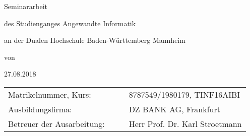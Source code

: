	\begin{titlepage}
		
		\centering
		{\Large\bfseries \Titel \par}
		\vspace{2cm}
		Seminararbeit \par
		\vspace{3cm}
		
		des Studienganges Angewandte Informatik \par
		an der Dualen Hochschule Baden-Württemberg Mannheim \par
		\vspace{3cm}
		
		von \par
		\vspace{0.5cm}
		{\itshape \Autor \par}
		\vspace{2cm}
		27.08.2018 \par
		
		\vspace{6.5cm}
		\begin{tabular}{llll}
			Matrikelnummer, Kurs: & & & 8787549/1980179, TINF16AIBI\\
			Ausbildungsfirma: & & & DZ BANK AG, Frankfurt\\
			Betreuer der Ausarbeitung: & & & Herr Prof. Dr. Karl Stroetmann
		\end{tabular}
	\end{titlepage}